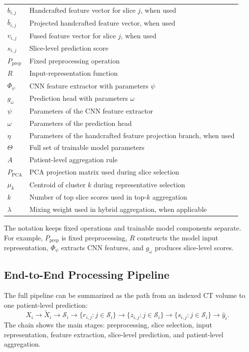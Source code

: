 \begin{table}[H]
\begin{tabular}{ll}
\(b_{i,j}\) & Handcrafted feature vector for slice \(j\), when used \\
\(\bar{b}_{i,j}\) & Projected handcrafted feature vector, when used \\
\(v_{i,j}\) & Fused feature vector for slice \(j\), when used \\
\(s_{i,j}\) & Slice-level prediction score \\
\(P_{\mathrm{prep}}\) & Fixed preprocessing operation \\
\(R\) & Input-representation function \\
\(\Phi_{\psi}\) & CNN feature extractor with parameters \(\psi\) \\
\(g_{\omega}\) & Prediction head with parameters \(\omega\) \\
\(\psi\) & Parameters of the CNN feature extractor \\
\(\omega\) & Parameters of the prediction head \\
\(\eta\) & Parameters of the handcrafted feature projection branch, when used \\
\(\Theta\) & Full set of trainable model parameters \\
\(A\) & Patient-level aggregation rule \\
\(P_{\mathrm{PCA}}\) & PCA projection matrix used during slice selection \\
\(\mu_k\) & Centroid of cluster \(k\) during representative selection \\
\(k\) & Number of top slice scores used in top-\(k\) aggregation \\
\(\lambda\) & Mixing weight used in hybrid aggregation, when applicable \\
\bottomrule
\end{tabular}
\end{table}

The notation keeps fixed operations and trainable model components separate. For example, \(P_{\mathrm{prep}}\) is fixed preprocessing, \(R\) constructs the model input representation, \(\Phi_{\psi}\) extracts CNN features, and \(g_{\omega}\) produces slice-level scores.


\subsection{End-to-End Processing Pipeline}
\label{sec:end_to_end_prediction_chain}

The full pipeline can be summarized as the path from an indexed CT volume to one patient-level prediction:
\[
X_i
\rightarrow
\tilde{X}_i
\rightarrow
\mathcal{S}_i
\rightarrow
\{r_{i,j}: j \in \mathcal{S}_i\}
\rightarrow
\{z_{i,j}: j \in \mathcal{S}_i\}
\rightarrow
\{s_{i,j}: j \in \mathcal{S}_i\}
\rightarrow
\hat{y}_i.
\]
The chain shows the main stages: preprocessing, slice selection, input representation, feature extraction, slice-level prediction, and patient-level aggregation.

